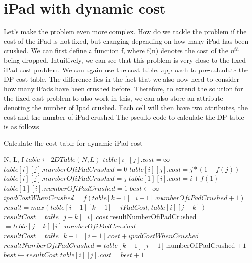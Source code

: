 \documentclass[12pt,a4paper,oneside]{report}
\begin{document}
\section{iPad with dynamic cost}
Let's make the problem even more complex. How do we tackle the problem if the cost of the iPad is not fixed, but changing depending on how many iPad has been crushed. 
We can first define a function f, where f(n) denotes the cost of the $n^{th}$ being dropped.
Intuitively, we can see that this problem is very close to the fixed iPad cost problem. We can again use the cost table. approach to pre-calculate the DP cost table. The difference lies in the fact that we also now need to consider how many iPads have been crushed before.
Therefore, to extend the solution for the fixed cost problem to also work in this, we can also store an attribute denoting the number of Ipad crushed. Each cell will then have two attributes, the cost and the number of iPad crushed
The pseudo code to calculate the DP table is as follows

\begin{algorithm}[H]
\caption{Calculate the cost table for dynamic iPad cost}
\begin{algorithmic}[1]
\REQUIRE N, L, f
\STATE $table \leftarrow 2DTable(N, L)$
		\STATE $table[i][j].cost = \infty$
		\STATE $table[i][j].numberOfiPadCrushed = 0$
	\ENDFOR
\ENDFOR
{}
		\STATE $table[i][j].cost = j*(1 + f(j))$
		\STATE $table[i][j].numberOfiPadCrushed = j$
	\ENDFOR
\ENDFOR
{}
	\STATE $table[1][i].cost = i + f(1)$
	\STATE $table[1][i].numberOfiPadCrushed = 1$
\ENDFOR
{}
		\STATE $best \leftarrow \infty$
			\STATE $ipadCostWhenCrushed =  f(table[k-1][i-1].numberOfiPadCrushed +1)$
			\STATE $result = max(table[i - 1][k - 1] + iPadCost, table[i][j - k])$
				\STATE $resultCost= table[j-k][i].cost$
				\STATE resultNumberOfiPadCrushed $= table[j-k][i].numberOfiPadCrushed$
			\ELSE
				\STATE $resultCost= table[k-1][i-1].cost + ipadCostWhenCrushed$
				\STATE $resultNumberOfiPadCrushed = table[k-1][i-1].$numberOfiPadCrushed $+ 1$	
			\ENDIF
				\STATE $best \leftarrow resultCost$
			\ENDIF
		\ENDFOR
		\STATE $table[i][j].cost = best + 1$
	\ENDFOR
\ENDFOR
\end{algorithmic}
\end{algorithm}
\end{document}
